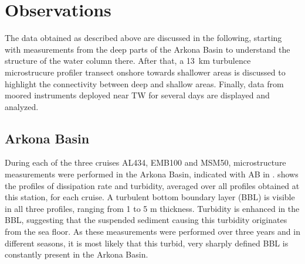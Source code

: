 \section{Observations}

 The data obtained as described above are discussed in the following, starting 
with measurements from 
the 
deep parts of the Arkona Basin to understand the structure of the water 
column there. After that, a 13~km turbulence microstrucure profiler transect 
onshore towards shallower areas is discussed to highlight the connectivity 
between deep and shallow areas. Finally, data from moored 
instruments deployed near TW for several days are displayed and analyzed.

\subsection{Arkona Basin}

 During each of the three cruises AL434, EMB100 and MSM50, 
microstructure measurements were performed in the Arkona Basin, indicated with 
AB in .  shows the 
profiles of 
dissipation rate and turbidity, averaged over all profiles obtained at this 
station, for each cruise. A turbulent bottom boundary layer (BBL) is visible 
in 
all three profiles, ranging from 1 to 5 m thickness. 
Turbidity is enhanced in the BBL, suggesting that the suspended 
sediment causing this turbidity originates from the sea floor. As these 
measurements were performed over three years and in different 
seasons, it is most likely that this turbid, very sharply defined BBL is 
constantly present in the Arkona Basin.

